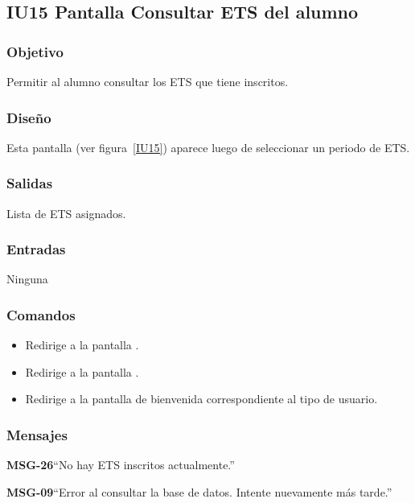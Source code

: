 \subsection{IU15 Pantalla Consultar ETS del alumno}

\subsubsection{Objetivo}
Permitir al alumno consultar los ETS que tiene inscritos. 

\subsubsection{Diseño}
Esta pantalla  (ver figura~\ref{IU15}) aparece luego de seleccionar un periodo de ETS. 


\subsubsection{Salidas}
Lista de ETS asignados. 

\subsubsection{Entradas}
Ninguna


\subsubsection{Comandos}

\begin{itemize}
	\item {} Redirige a la pantalla .
	\item {} Redirige a la pantalla .
	\item {} Redirige a la pantalla de bienvenida correspondiente al tipo de usuario.
\end{itemize}
\subsubsection{Mensajes}

\begin{Citemize}
	\item {\bf MSG-26}{``No hay ETS inscritos actualmente.''}
	\item {\bf MSG-09}{``Error al consultar la base de datos. Intente nuevamente más tarde.''}
\end{Citemize}
